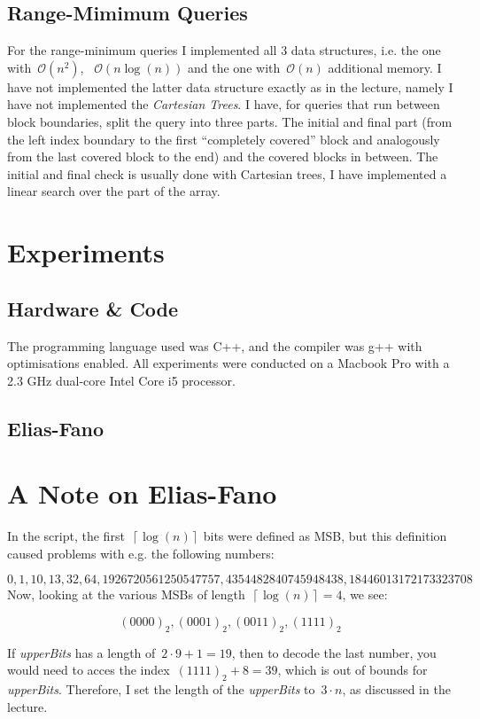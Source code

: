 \documentclass[a4paper,UKenglish,cleveref, autoref, thm-restate]{lipics-v2021}
\begin{document}
	\subsection{Range-Mimimum Queries}
	For the range-minimum queries I implemented all 3 data structures, i.e. the one with~$\mathcal{O}\left(n^2\right)$, ~$\mathcal{O}\left(n \log\left(n\right)\right)$ and the one with~$\mathcal{O}\left(n\right)$ additional memory. I have not implemented the latter data structure exactly as in the lecture, namely I have not implemented the \textit{Cartesian Trees}. I have, for queries that run between block boundaries, split the query into three parts. The initial and final part (from the left index boundary to the first ``completely covered'' block and analogously from the last covered block to the end) and the covered blocks in between. The initial and final check is usually done with Cartesian trees, I have implemented a linear search over the part of the array.
	
	\section{Experiments}
	\subsection{Hardware \& Code}
	The programming language used was C++, and the compiler was g++ with optimisations enabled. All experiments were conducted on a Macbook Pro with a 2.3 GHz dual-core Intel Core i5 processor.

	\subsection{Elias-Fano}
	
	
	
	
	\appendix
	\section{A Note on Elias-Fano}
	\label{app:sec::ef}
	In the script, the first~$\left\lceil \log\left(n\right)\right\rceil$ bits were defined as MSB, but this definition caused problems with e.g. the following numbers:
	
	\begin{equation*}
		0, 1, 10, 13, 32, 64, 1926720561250547757, 4354482840745948438, 18446013172173323708
	\end{equation*}
	Now, looking at the various MSBs of length~$\left\lceil \log\left(n\right)\right\rceil = 4$, we see:
	
	\begin{equation}
		\left(0000\right)_2, \left(0001\right)_2, \left(0011\right)_2, \left(1111\right)_2
	\end{equation}
	
	If \textit{upperBits} has a length of~$2\cdot9+1 = 19$, then to decode the last number, you would need to acces the index~$\left(1111\right)_2 + 8 = 39$, which is out of bounds for \textit{upperBits}. Therefore, I set the length of the \textit{upperBits} to~$3 \cdot n$, as discussed in the lecture.
\end{document}
